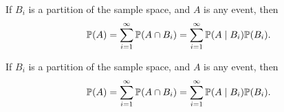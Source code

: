 \begin{note}
  \begin{field}
    \begin{prop}
      If $B_i$ is a partition of the sample space, and $A$ is any event, then
      \[
        \P(A) = \sum_{i = 1}^\infty \P(A\cap B_i) = \sum_{i = 1}^\infty \P(A\mid B_i) \P(B_i).
      \]
    \end{prop}
  \end{field}
  \begin{field}
    \begin{prop}
      If $B_i$ is a partition of the sample space, and $A$ is any event, then
      \[
        \P(A) = \sum_{i = 1}^\infty \P(A\cap B_i) = \sum_{i = 1}^\infty \P(A\mid B_i) \P(B_i).
      \]
    \end{prop}
  \end{field}
  \xplain{}%
\end{note}

